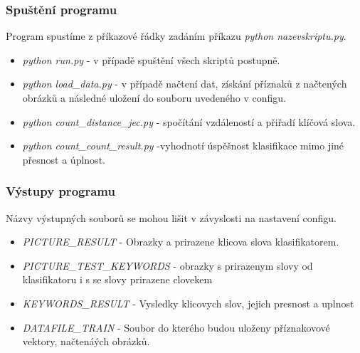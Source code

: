 \documentclass[czech,BP]{thesiskiv}
\begin{document}
\subsubsection{Spuštění programu}
Program spustíme z příkazové řádky zadáním příkazu \textit{python nazevskriptu.py}. 
\begin{itemize}
	\item \textit{python run.py} - v případě spuštění všech skriptů postupně.
	\item \textit{python load\_data.py} - v případě načtení dat, získání příznaků z načtených obrázků a následné uložení do souboru uvedeného v configu.
	\item \textit{python count\_distance\_jec.py} - spočítání vzdáleností a přiřadí klíčová slova.
	\item \textit{python count\_count\_result.py} -vyhodnotí úspěšnost klasifikace mimo jiné přesnost a úplnost.
\end{itemize}

\subsubsection{Výstupy programu}
Názvy výstupných souborů se mohou lišit v závyslosti na nastavení configu.
\begin{itemize}
	\item \textit{PICTURE\_RESULT} - Obrazky a prirazene klicova slova klasifikatorem.
	\item \textit{PICTURE\_TEST\_KEYWORDS} - obrazky s prirazenym slovy od klasifikatoru i s se slovy prirazene clovekem
	\item \textit{KEYWORDS\_RESULT} - Vysledky klicovych slov, jejich presnost a uplnost
	\item \textit{DATAFILE\_TRAIN} - Soubor do kterého budou uloženy příznakovové vektory, načtenáých obrázků. 
\end{itemize}
	
\end{document}

